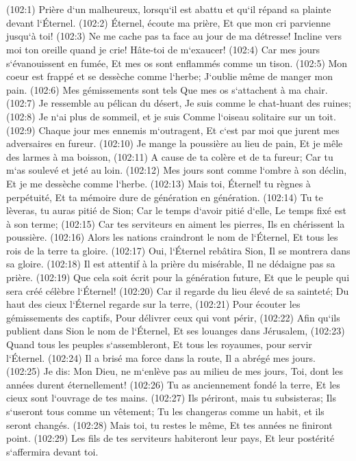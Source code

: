 \chapter{}

\verse (102:1) Prière d`un malheureux, lorsqu`il est abattu et qu`il répand sa plainte devant l`Éternel. (102:2) Éternel, écoute ma prière, Et que mon cri parvienne jusqu`à toi! 
\verse (102:3) Ne me cache pas ta face au jour de ma détresse! Incline vers moi ton oreille quand je crie! Hâte-toi de m`exaucer! 
\verse (102:4) Car mes jours s`évanouissent en fumée, Et mes os sont enflammés comme un tison. 
\verse (102:5) Mon coeur est frappé et se dessèche comme l`herbe; J`oublie même de manger mon pain. 
\verse (102:6) Mes gémissements sont tels Que mes os s`attachent à ma chair. 
\verse (102:7) Je ressemble au pélican du désert, Je suis comme le chat-huant des ruines; 
\verse (102:8) Je n`ai plus de sommeil, et je suis Comme l`oiseau solitaire sur un toit. 
\verse (102:9) Chaque jour mes ennemis m`outragent, Et c`est par moi que jurent mes adversaires en fureur. 
\verse (102:10) Je mange la poussière au lieu de pain, Et je mêle des larmes à ma boisson, 
\verse (102:11) A cause de ta colère et de ta fureur; Car tu m`as soulevé et jeté au loin. 
\verse (102:12) Mes jours sont comme l`ombre à son déclin, Et je me dessèche comme l`herbe. 
\verse (102:13) Mais toi, Éternel! tu règnes à perpétuité, Et ta mémoire dure de génération en génération. 
\verse (102:14) Tu te lèveras, tu auras pitié de Sion; Car le temps d`avoir pitié d`elle, Le temps fixé est à son terme; 
\verse (102:15) Car tes serviteurs en aiment les pierres, Ils en chérissent la poussière. 
\verse (102:16) Alors les nations craindront le nom de l`Éternel, Et tous les rois de la terre ta gloire. 
\verse (102:17) Oui, l`Éternel rebâtira Sion, Il se montrera dans sa gloire. 
\verse (102:18) Il est attentif à la prière du misérable, Il ne dédaigne pas sa prière. 
\verse (102:19) Que cela soit écrit pour la génération future, Et que le peuple qui sera créé célèbre l`Éternel! 
\verse (102:20) Car il regarde du lieu élevé de sa sainteté; Du haut des cieux l`Éternel regarde sur la terre, 
\verse (102:21) Pour écouter les gémissements des captifs, Pour délivrer ceux qui vont périr, 
\verse (102:22) Afin qu`ils publient dans Sion le nom de l`Éternel, Et ses louanges dans Jérusalem, 
\verse (102:23) Quand tous les peuples s`assembleront, Et tous les royaumes, pour servir l`Éternel. 
\verse (102:24) Il a brisé ma force dans la route, Il a abrégé mes jours. 
\verse (102:25) Je dis: Mon Dieu, ne m`enlève pas au milieu de mes jours, Toi, dont les années durent éternellement! 
\verse (102:26) Tu as anciennement fondé la terre, Et les cieux sont l`ouvrage de tes mains. 
\verse (102:27) Ils périront, mais tu subsisteras; Ils s`useront tous comme un vêtement; Tu les changeras comme un habit, et ils seront changés. 
\verse (102:28) Mais toi, tu restes le même, Et tes années ne finiront point. 
\verse (102:29) Les fils de tes serviteurs habiteront leur pays, Et leur postérité s`affermira devant toi. 


